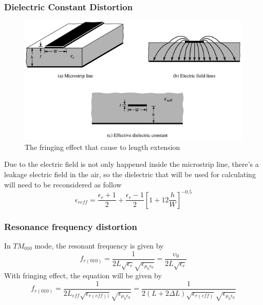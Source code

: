 \documentclass[11pt,a4paper]{article}
\begin{document}
    \subsubsection{Dielectric Constant Distortion}
      \begin{figure}[ht]
        \includegraphics{dielectivef.png}
        \centering
        \caption{The fringing effect that cause to length extension}
      \end{figure}
      \indent Due to the electric field is not only happened inside the microstrip line, there's a leakage electric field in the air,
              so the dielectric that will be used for calculating will need to be reconsidered as follow\cite{CoB:05}
      \begin{equation}
        \epsilon_{reff} = \frac{\epsilon_{r} + 1}{2} + \frac{\epsilon_{r} - 1}{2}[1 + 12\frac{h}{W}]^{-0.5}
      \end{equation}

    \subsubsection{Resonance frequency distortion}
        \indent In $TM_{010}$ mode, the resonant frequency is given by
        \begin{equation}  
          f_{r(010)} =  \frac{1}{2 L\sqrt{\epsilon_{r}}\sqrt{\epsilon_{\mu_{0}\epsilon_{0}}}}= \frac{\upsilon_{0}}{2L\sqrt{\epsilon_{r}}}
        \end{equation}
        \indent With fringing effect, the equation will be given by
        \begin{equation} 
          f_{r(010)} =  \frac{1}{2 L_{eff}\sqrt{\epsilon_{r(eff))}}\sqrt{\epsilon_{\mu_{0}\epsilon_{0}}}}=\frac{1}{2(L + 2\Delta L)\sqrt{\epsilon_{r(eff)}}\sqrt{\epsilon_{\mu_{0}\epsilon_{0}}}}
        \end{equation} 
  
\end{document}
